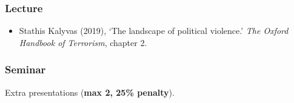 \documentclass[12pt, a4paper]{article}
\begin{document}
\subsubsection*{Lecture}

\begin{itemize}
\setlength\itemsep{0pt}
\item Stathis Kalyvas (2019), `The landscape of political violence.' \textit{The Oxford Handbook of Terrorism}, chapter 2.
\end{itemize}

\subsubsection*{Seminar}

Extra presentations (\textbf{max 2, 25\% penalty}).
\end{document}
